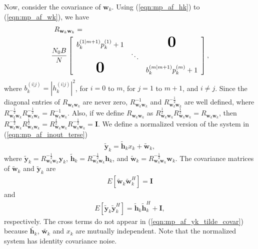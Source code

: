 \documentclass[journal]{IEEEtran}
\begin{document}
Now, consider the covariance of $\mathbf{w}_k$.  Using
(\ref{eqn:mp_af_hk}) to (\ref{eqn:mp_af_wk}), we have
\begin{eqnarray}
R_{\mathbf{w}_k\mathbf{w}_k} = \hspace{2.5 in} \nonumber \\
\frac{N_0B}{N} \left[
\begin{array}{ccc}
b_k^{(1|m+1)} p_k^{(1)}  + 1 & & \textbf{\mbox{\huge{0}}} \\
 & \ddots & \\
\textbf{\mbox{\huge{0}}}  & &  b_k^{(m|m+1)} p_k^{(m)} + 1
\end{array} \right],
\label{eqn:mp_af_Rwkwk}
\end{eqnarray}
where $b_k^{(i|j)} = \left| h_k^{(i|j)} \right|^2$, for $i=0$ to
$m$, for $j=1$ to $m+1$, and $i \neq j$. Since the diagonal
entries of $R_{\mathbf{w}_k\mathbf{w}_k}$ are never zero,
$R_{\mathbf{w}_k\mathbf{w}_k}^{-1}$ and
$R_{\mathbf{w}_k\mathbf{w}_k}^{-\frac{1}{2}}$ are well defined,
where
$R_{\mathbf{w}_k\mathbf{w}_k}^{-\frac{1}{2}}R_{\mathbf{w}_k\mathbf{w}_k}^{-\frac{1}{2}}
= R_{\mathbf{w}_k\mathbf{w}_k}^{-1}$. Also, if we define
$R_{\mathbf{w}_k\mathbf{w}_k}$ as
$R_{\mathbf{w}_k\mathbf{w}_k}^{\frac{1}{2}}
R_{\mathbf{w}_k\mathbf{w}_k}^{\frac{1}{2}}
=R_{\mathbf{w}_k\mathbf{w}_k}$, then
$R_{\mathbf{w}_k\mathbf{w}_k}^{-\frac{1}{2}}R_{\mathbf{w}_k\mathbf{w}_k}^{\frac{1}{2}}
=
R_{\mathbf{w}_k\mathbf{w}_k}^{\frac{1}{2}}R_{\mathbf{w}_k\mathbf{w}_k}^{-\frac{1}{2}}
= \mathbf{I}$. We define a normalized version of the system in
(\ref{eqn:mp_af_inout_terse})
\begin{eqnarray}
\tilde{\mathbf{y}}_k = \tilde{\mathbf{h}}_k x_k +
\tilde{\mathbf{w}}_k,
\end{eqnarray}
where $\tilde{\mathbf{y}}_k =
R_{\mathbf{w}_k\mathbf{w}_k}^{-\frac{1}{2}} \mathbf{y}_k$,
$\tilde{\mathbf{h}}_k =R_{\mathbf{w}_k\mathbf{w}_k}^{-\frac{1}{2}}
\mathbf{h}_k$, and $\tilde{\mathbf{w}}_k =
R_{\mathbf{w}_k\mathbf{w}_k}^{-\frac{1}{2}} \mathbf{w}_k$.  The
covariance matrices of $\tilde{\mathbf{w}}_k$ and
$\tilde{\mathbf{y}}_k$ are
\begin{eqnarray}
E \left[ \tilde{\mathbf{w}}_k \tilde{\mathbf{w}}_k^H \right]
 = \mathbf{I}
\end{eqnarray}
and
\begin{eqnarray}
E \left[ \tilde{\mathbf{y}}_k \tilde{\mathbf{y}}_k^H
\right]=\tilde{\mathbf{h}}_k \tilde{\mathbf{h}}_k^H + \mathbf{I},
\label{eqn:mp_af_yk_tilde_covar}
\end{eqnarray}
respectively.  The cross terms do not appear in
(\ref{eqn:mp_af_yk_tilde_covar}) because $\tilde{\mathbf{h}_k}$,
$\tilde{\mathbf{w}_k}$ and $x_k$ are mutually independent.  Note
that the normalized system has identity covariance noise.
\end{document}
